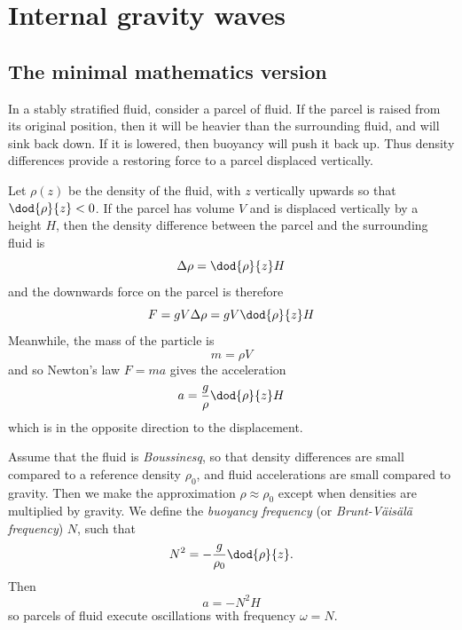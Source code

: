 \newpage
\section{Internal gravity waves}
\subsection{The minimal mathematics version}

In a stably stratified fluid, consider a parcel of fluid. If the parcel is raised from its original position, then it will be heavier than the surrounding fluid, and will sink back down. If it is lowered, then buoyancy will push it back up. Thus density differences provide a restoring force to a parcel displaced vertically. 

Let $\rho(z)$ be the density of the fluid, with $z$ vertically upwards so that $\dod{\rho}{z} < 0$. If the parcel has volume $V$ and is displaced vertically by a height $H$, then the density difference between the parcel and the surrounding fluid is 
\begin{equation}
	\Delta\rho = \dod{\rho}{z} H
\end{equation}
and the downwards force on the parcel is therefore
\begin{equation}
	F = gV\Delta\rho = gV\dod{\rho}{z}H
\end{equation}
Meanwhile, the mass of the particle is 
\begin{equation}
	m = \rho V
\end{equation}
and so Newton's law $F = ma$ gives the acceleration
\begin{equation}
	a = \frac{g}{\rho}\dod{\rho}{z} H
\end{equation}
which is in the opposite direction to the displacement.

Assume that the fluid is \textit{Boussinesq}, so that density differences are small compared to a reference density $\rho_0$, and fluid accelerations are small compared to gravity. Then we make the approximation $\rho\approx\rho_0$ except when densities are multiplied by gravity. We define the \textit{buoyancy frequency} (or \textit{Brunt-V\"ais\"al\"a frequency}) $N$, such that
\begin{equation}
	N^2 = -\frac{g}{\rho_0}\dod{\rho}{z}.
\end{equation}
Then 
\begin{equation}
	a = -N^2 H
\end{equation}
so parcels of fluid execute oscillations with frequency $\omega = N$.

